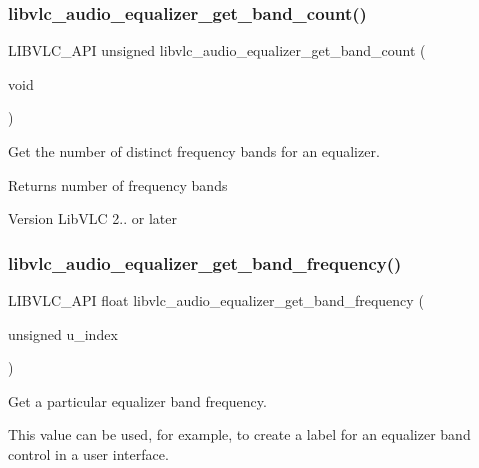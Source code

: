 \subsubsection{\texorpdfstring{libvlc\+\_\+audio\+\_\+equalizer\+\_\+get\+\_\+band\+\_\+count()}{libvlc\_audio\_equalizer\_get\_band\_count()}}
{\footnotesize\ttfamily L\+I\+B\+V\+L\+C\+\_\+\+A\+PI unsigned libvlc\+\_\+audio\+\_\+equalizer\+\_\+get\+\_\+band\+\_\+count (\begin{DoxyParamCaption}\item[{void}]{ }\end{DoxyParamCaption})}

Get the number of distinct frequency bands for an equalizer.

\begin{DoxyReturn}{Returns}
number of frequency bands 
\end{DoxyReturn}
\begin{DoxyVersion}{Version}
Lib\+V\+LC 2.. or later 
\end{DoxyVersion}
\mbox{\label{group__libvlc__audio_ga4dd31672321d9e2656ca32681d8cdbe6}} 
\subsubsection{\texorpdfstring{libvlc\+\_\+audio\+\_\+equalizer\+\_\+get\+\_\+band\+\_\+frequency()}{libvlc\_audio\_equalizer\_get\_band\_frequency()}}
{\footnotesize\ttfamily L\+I\+B\+V\+L\+C\+\_\+\+A\+PI float libvlc\+\_\+audio\+\_\+equalizer\+\_\+get\+\_\+band\+\_\+frequency (\begin{DoxyParamCaption}\item[{unsigned}]{u\+\_\+index }\end{DoxyParamCaption})}

Get a particular equalizer band frequency.

This value can be used, for example, to create a label for an equalizer band control in a user interface.


